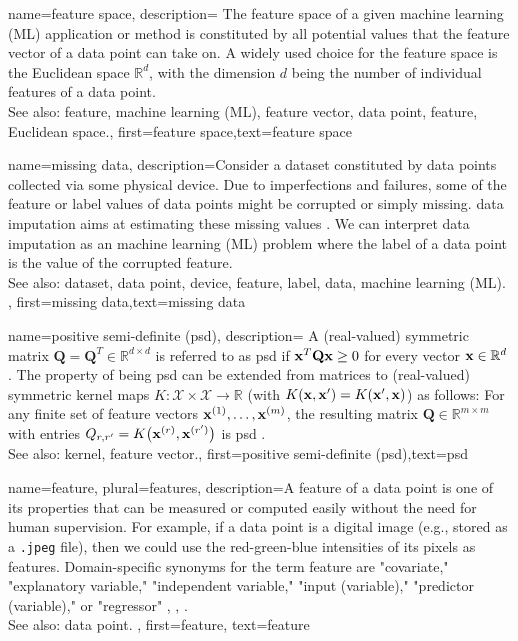{name={feature space},
	description={
		The feature space of a given machine learning (ML) application or method is 
		constituted by all potential values that the feature vector of a data point can 
		take on. A widely used choice for the feature space is the Euclidean space $\mathbb{R}^{d}$, 
		with the dimension $d$ being the number of individual features of a data point.
				\\
		See also: feature, machine learning (ML), feature vector, data point, feature, Euclidean space.},
	first={feature space},text={feature space}  
}


{name={missing data},
	description={Consider a dataset constituted by data points collected via 
		some physical device. Due to imperfections and failures, some of the feature 
		or label values of data points might be corrupted or simply missing. 
		\Gls{data} imputation aims at estimating these missing values \cite{Abayomi2008DiagnosticsFM}. 
		We can interpret data imputation as an machine learning (ML) problem where the label of a data point is 
		the value of the corrupted feature.
				\\
		See also: dataset, data point, device, feature, label, data, machine learning (ML). },
	first={missing data},text={missing data}  
}


{name={positive semi-definite (psd)},
	description=
	{A (real-valued) symmetric matrix $\mathbf{Q} = \mathbf{Q}^{T} \in \mathbb{R}^{d \times d}$ 
	 is referred to as psd if ${\bf x}^{T} \mathbf{Q} {\bf x} \geq 0$ for every vector ${\bf x} \in \mathbb{R}^{d}$. 
	 The property of being psd can be extended from matrices to (real-valued) 
	 symmetric kernel maps $K: \mathcal{X} \times \mathcal{X} \rightarrow \mathbb{R}$ 
	 (with $K({\bf x},{\bf x}') = K({\bf x}',{\bf x})$)
	 as follows: For any finite set of feature vectors ${\bf x}^{(1)},\dots,{\bf x}^{(m)}$, 
	 the resulting matrix $\mathbf{Q} \in \mathbb{R}^{m \times m}$ with 
	entries $Q_{r,r'} = K\big({\bf x}^{(r)},{\bf x}^{(r')}\big)$ 
	is psd \cite{LearningKernelsBook}.
			\\
		See also: kernel, feature vector.},
	first={positive semi-definite (psd)},text={psd}  
}

{name={feature}, plural={features},
	description={A feature of a data point is one of its properties that can be 
		measured or computed easily without the need for human supervision. For example, if a data point 
		is a digital image (e.g., stored as a \texttt{.jpeg} file), then we could use the red-green-blue intensities 
		of its pixels as features. Domain-specific synonyms for the term feature are "covariate," "explanatory variable," 
		"independent variable," "input (variable)," "predictor (variable)," or "regressor" \cite{Gujarati2021}, \cite{Dodge2003}, \cite{Everitt2022}. 
				\\
		See also: data point.
		}, first={feature},
		text={feature}  
}

